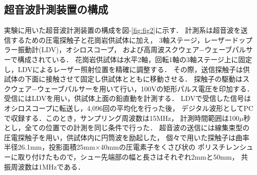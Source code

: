 \subsection{超音波計測装置の構成}
実験に用いた超音波計測装置の構成を図-\ref{fig:fig2}に示す．
計測系は超音波を送信するための圧電探触子と花崗岩供試体に加え，
3軸ステージ，レーザードップラー振動計(LDV)，オシロスコープ，
および高周波スクウェア−ウェーブパルサーで構成されている．
花崗岩供試体は水平2軸，回転1軸の3軸ステージ上に固定し，LDVによるレーザー照射位置を精確に調整する．
その際，送信探触子は供試体の下面に接触させて固定し供試体とともに移動させる．
探触子の駆動はスクウェア−ウェーブパルサーを用いて行い，100Vの矩形パルス電圧を印加する．
受信にはLDVを用い，供試体上面の鉛直動を計測する．
LDVで受信した信号はオシロスコープに転送し，4,096回の平均化を行った後，
デジタル波形としてPCで収録する．このとき，サンプリング周波数は15MHz，
計測時間範囲は100$\mu$秒とし，全ての位置での計測を同じ条件で行った．
超音波の送信には線集束型の圧電探触子を用い，供試体内に円筒波を励起した，
個々で用いた探触子は曲率半径26.1mm，投影面積25mm×40mmの圧電素子をくさび状の
ポリスチレンシューに取り付けたもので，シュー先端部の幅と長さはそれぞれ2mmと50mm，
共振周波数は1MHzである．
